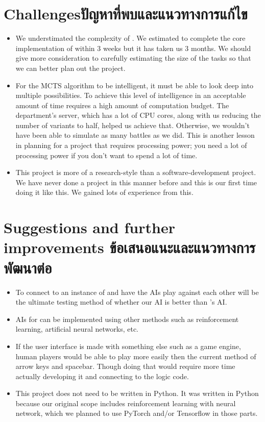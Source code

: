 \section{\ifenglish Challenges\else ปัญหาที่พบและแนวทางการแก้ไข\fi}

\begin{itemize}
    \item We understimated the complexity of \RootB{}. We estimated to complete the core implementation of \RootOurs{} within 3 weeks but it has taken us 3 months. We should give more consideration to carefully estimating the size of the tasks so that we can better plan out the project.
    \item For the MCTS algorithm to be intelligent, it must be able to look deep into multiple possibilities. To achieve this level of intelligence in an acceptable amount of time requires a high amount of computation budget. The department's server, which has a lot of CPU cores, along with us reducing the number of variants to half, helped us achieve that. Otherwise, we wouldn't have been able to simulate as many battles as we did. This is another lesson in planning for a project that requires processing power; you need a lot of processing power if you don't want to spend a lot of time.
    \item This project is more of a research-style than a software-development project. We have never done a project in this manner before and this is our first time doing it like this. We gained lots of experience from this.
\end{itemize}

\section{\ifenglish%
Suggestions and further improvements
\else%
ข้อเสนอแนะและแนวทางการพัฒนาต่อ
\fi
}

\begin{itemize}
    \item To connect \RootAI{} to an instance of \RootV{} and have the AIs play against each other will be the ultimate testing method of whether our AI is better than \RootV{}'s AI. 
    \item AIs for \RootB{} can be implemented using other methods such as reinforcement learning, artificial neural networks, etc.
    \item If the user interface is made with something else such as a game engine, human players would be able to play \RootOurs{} more easily then the current method of arrow keys and spacebar. Though doing that would require more time actually developing it and connecting to the logic code.
    \item This project does not need to be written in Python. It was written in Python because our original scope includes reinforcement learning with neural network, which we planned to use PyTorch and/or Tensorflow in those parts.
\end{itemize}

